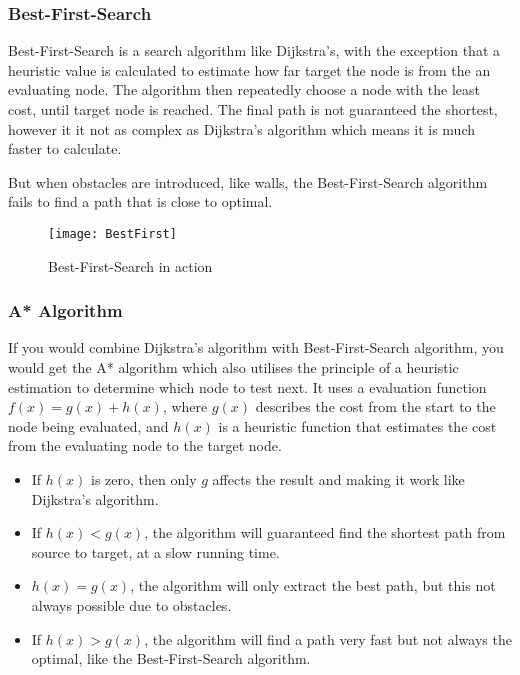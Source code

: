   \subsubsection{Best-First-Search}

  Best-First-Search is a search algorithm like Dijkstra's, with the exception that a heuristic value is calculated to estimate how far target the node is from the an evaluating node. The algorithm then repeatedly choose a node with the least cost, until target node is reached. The final path is not guaranteed the shortest, however it it not as complex as Dijkstra's algorithm which means it is much faster to calculate. \cite{BestFirst}

  But when obstacles are introduced, like walls, the Best-First-Search algorithm fails to find a path that is close to optimal.

  \begin{figure}[ht!]
    \centering
    \texttt{[image: BestFirst]} 
    \caption{Best-First-Search in action}
    \label{bestfirst}
  \end{figure}

  \subsubsection{A* Algorithm}

  If you would combine Dijkstra's algorithm with Best-First-Search algorithm, you would get the A* algorithm which also utilises the principle of a heuristic estimation to determine which node to test next. It uses a evaluation function $f(x) = g(x) + h(x)$, where $g(x)$ describes the cost from the start to the node being evaluated, and $h(x)$ is a heuristic function that estimates the cost from the evaluating node to the target node. \cite{http://theory.stanford.edu/}

  \begin{itemize}
    \item If $h(x)$ is zero, then only $g$ affects the result and making it work like Dijkstra's algorithm.

    \item If $h(x) < g(x)$, the algorithm will guaranteed find the shortest path from source to target, at a slow running time.

    \item $h(x) = g(x)$, the algorithm will only extract the best path, but this not always possible due to obstacles.

    \item If $h(x) > g(x)$, the algorithm will find a path very fast but not always the optimal, like the Best-First-Search algorithm.
  \end{itemize}

